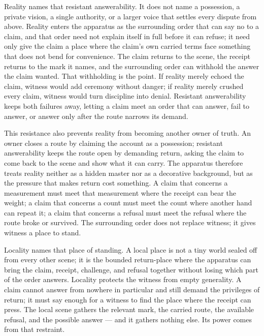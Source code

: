 Reality names that resistant answerability. It does not name a possession, a private vision, a single authority, or a larger voice that settles every dispute from above. Reality enters the apparatus as the surrounding order that can say no to a claim, and that order need not explain itself in full before it can refuse; it need only give the claim a place where the claim's own carried terms face something that does not bend for convenience. The claim returns to the scene, the receipt returns to the mark it names, and the surrounding order can withhold the answer the claim wanted. That withholding is the point. If reality merely echoed the claim, witness would add ceremony without danger; if reality merely crushed every claim, witness would turn discipline into denial. Resistant answerability keeps both failures away, letting a claim meet an order that can answer, fail to answer, or answer only after the route narrows its demand.

This resistance also prevents reality from becoming another owner of truth. An owner closes a route by claiming the account as a possession; resistant answerability keeps the route open by demanding return, asking the claim to come back to the scene and show what it can carry. The apparatus therefore treats reality neither as a hidden master nor as a decorative background, but as the pressure that makes return cost something. A claim that concerns a measurement must meet that measurement where the receipt can bear the weight; a claim that concerns a count must meet the count where another hand can repeat it; a claim that concerns a refusal must meet the refusal where the route broke or survived. The surrounding order does not replace witness; it gives witness a place to stand.

Locality names that place of standing. A local place is not a tiny world sealed off from every other scene; it is the bounded return-place where the apparatus can bring the claim, receipt, challenge, and refusal together without losing which part of the order answers. Locality protects the witness from empty generality. A claim cannot answer from nowhere in particular and still demand the privileges of return; it must say enough for a witness to find the place where the receipt can press. The local scene gathers the relevant mark, the carried route, the available refusal, and the possible answer --- and it gathers nothing else. Its power comes from that restraint.

